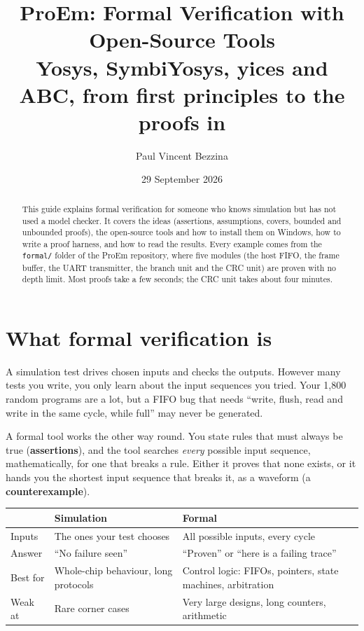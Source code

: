 \documentclass[11pt,a4paper]{article}
\title{\color{accent}\textbf{ProEm: Formal Verification with Open-Source Tools}\\[4pt]
\large Yosys, SymbiYosys, yices and ABC, from first principles to the proofs in \file{formal/}}
\author{Paul Vincent Bezzina}
\date{29 September 2026}
\newcommand{\file}[1]{\texttt{#1}}
\begin{document}
\maketitle

\begin{abstract}
This guide explains formal verification for someone who knows simulation but has not used a model checker. It covers the ideas (assertions, assumptions, covers, bounded and unbounded proofs), the open-source tools and how to install them on Windows, how to write a proof harness, and how to read the results. Every example comes from the \file{formal/} folder of the ProEm repository, where five modules (the host FIFO, the frame buffer, the UART transmitter, the branch unit and the CRC unit) are proven with no depth limit. Most proofs take a few seconds; the CRC unit takes about four minutes.
\end{abstract}

\tableofcontents
\newpage

\section{What formal verification is}

A simulation test drives chosen inputs and checks the outputs. However many tests you write, you only learn about the input sequences you tried. Your 1,800 random programs are a lot, but a FIFO bug that needs ``write, flush, read and write in the same cycle, while full'' may never be generated.

A formal tool works the other way round. You state rules that must always be true (\textbf{assertions}), and the tool searches \emph{every} possible input sequence, mathematically, for one that breaks a rule. Either it proves that none exists, or it hands you the shortest input sequence that breaks it, as a waveform (a \textbf{counterexample}).

\begin{center}
\begin{tabularx}{\linewidth}{@{}lXX@{}}
\toprule
 & Simulation & Formal \\
\midrule
Inputs & The ones your test chooses & All possible inputs, every cycle \\
Answer & ``No failure seen'' & ``Proven'' or ``here is a failing trace'' \\
Best for & Whole-chip behaviour, long protocols & Control logic: FIFOs, pointers, state machines, arbitration \\
Weak at & Rare corner cases & Very large designs, long counters, arithmetic \\
\bottomrule
\end{tabularx}
\end{center}
\end{document}
